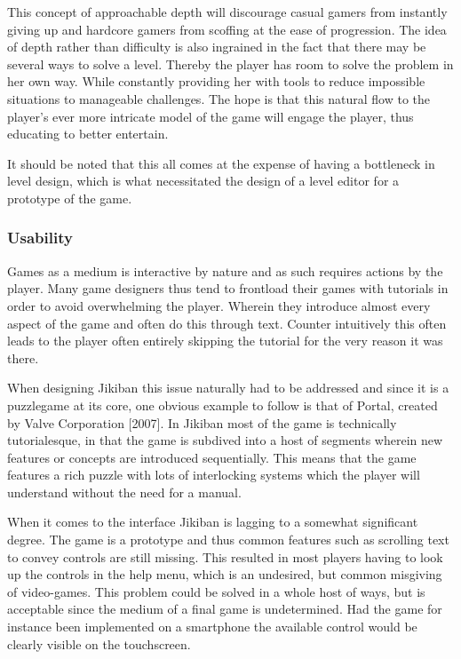This concept of approachable depth will discourage casual gamers from
instantly giving up and hardcore gamers from scoffing at the ease of
progression. The idea of depth rather than difficulty is also
ingrained in the fact that there may be several ways to solve a level.
Thereby the player has room to solve the problem in her own
way. While constantly providing her with tools to reduce impossible
situations to manageable challenges. The hope is that this natural
flow to the player’s ever more intricate model of the game will engage
the player, thus educating to better entertain.

It should be noted that this all comes at the expense of having a
bottleneck in level design, which is what necessitated the design of a
level editor for a prototype of the game.


\subsubsection{Usability}
Games as a medium is interactive by nature and as such requires
actions by the player. Many game designers thus tend to frontload
their games with tutorials in order to avoid overwhelming the player.
Wherein they introduce almost every aspect of the game and often do
this through text. Counter intuitively this often leads to the player
often entirely skipping the tutorial for the very reason it was there.

When designing Jikiban this issue naturally had to be addressed and
since it is a puzzlegame at its core, one obvious example to follow is
that of Portal, created by Valve Corporation [2007]. In Jikiban most
of the game is technically tutorialesque, in that the game is subdived
into a host of segments wherein new features or concepts are
introduced sequentially. This means that the game features a rich
puzzle with lots of interlocking systems which the player will
understand without the need for a manual.

When it comes to the interface Jikiban is lagging to a somewhat
significant degree. The game is a prototype and thus common features
such as scrolling text to convey controls are still missing. This
resulted in most players having to look up the controls in the help
menu, which is an undesired, but common misgiving of video-games. This
problem could be solved in a whole host of ways, but is acceptable
since the medium of a final game is undetermined. Had the game for
instance been implemented on a smartphone the available control would
be clearly visible on the touchscreen.

